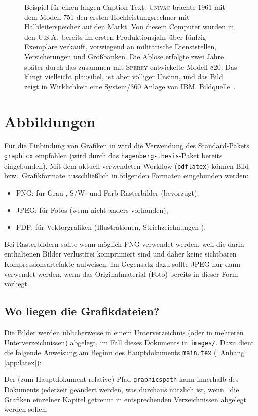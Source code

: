 \begin{figure}
	\centering
	\caption{Beispiel für einen langen Caption-Text. \textsc{Univac} brachte
	1961 mit dem Modell 751 den ersten Hochleistungsrechner mit
	Halbleiterspeicher auf den Markt. Von diesem Computer wurden in den U.S.A.\
	bereits im ersten Produktionsjahr über fünfzig Exemplare verkauft,
	vorwiegend an militärische Dienststellen, Versicherungen und
	Großbanken. Die Ablöse erfolgte zwei Jahre später durch das zusammen
	mit \textsc{Sperry} entwickelte Modell 820. Das klingt vielleicht
	plausibel, ist aber völliger Unsinn, und das Bild zeigt in Wirklichkeit
	eine System/360 Anlage von IBM. Bildquelle~\cite{IBM360}.}
	\label{fig:ibm360}
\end{figure}


\section{Abbildungen}

Für die Einbindung von Grafiken in \latex wird die Verwendung des
Stan\-dard-Pakets \texttt{graphicx} \cite{Carlisle2021} empfohlen (wird durch
das \texttt{hagenberg-thesis}-Paket bereits eingebunden). Mit dem aktuell
verwendeten Workflow (\texttt{pdflatex}) können Bild- bzw.\ Grafikformate
ausschließlich in folgenden Formaten eingebunden werden:
%
\begin{itemize}
	\item PNG: für Grau-, S/W- und Farb-Rasterbilder (bevorzugt),
	\item JPEG: für Fotos (wenn nicht anders vorhanden),
	\item PDF: für Vektorgrafiken (Illustrationen, Strichzeichnungen \etc).
\end{itemize}
%
Bei Rasterbildern sollte wenn möglich PNG verwendet werden, weil die darin
enthaltenen Bilder verlustfrei komprimiert sind und daher keine sichtbaren
Kompressionsartefakte aufweisen. Im Gegensatz dazu sollte JPEG nur dann
verwendet werden, wenn das Originalmaterial (Foto) bereits in dieser Form
vorliegt.


\subsection{Wo liegen die Grafikdateien?}

Die Bilder werden üblicherweise in einem Unterverzeichnis (oder in mehreren
Unterverzeichnissen) abgelegt, im Fall dieses Dokuments in
\nolinkurl{images/}. Dazu dient die folgende Anweisung am Beginn des
Hauptdokuments \nolinkurl{main.tex} (\sa\ Anhang \ref{app:latex}):
%
\begin{GenericCode}[numbers=none]
\graphicspath{{images/}}
\end{GenericCode}
%
Der (zum Hauptdokument relative) Pfad \texttt{graphicspath} kann innerhalb
des Dokuments jederzeit geändert werden, was durchaus nützlich ist, wenn \zB\
die Grafiken einzelner Kapitel getrennt in entsprechenden Verzeichnissen
abgelegt werden sollen.



